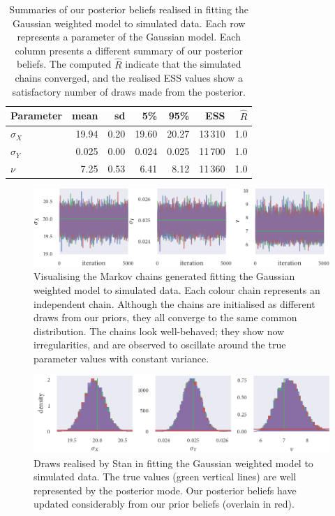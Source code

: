 \begin{table}[tbp]
  \begin{tabular}{@{}lrrrrrr@{}}
    \toprule
    Parameter    & mean  & sd   & 5\%   & 95\%  & ESS     & $\widehat{R}$ \\
    \midrule
    $\sigma_{X}$ & 19.94 & 0.20 & 19.60 & 20.27 & 13\,310 & 1.0           \\
    $\sigma_{Y}$ & 0.025 & 0.00 & 0.024 & 0.025 & 11\,700 & 1.0           \\
    $\nu$        & 7.25  & 0.53 & 6.41  & 8.12  & 11\,360 & 1.0           \\
    \bottomrule
  \end{tabular}
  \caption{Summaries of our posterior beliefs realised in fitting the Gaussian
    weighted model to simulated data. Each row represents a parameter of the
    Gaussian model. Each column presents a different summary of our posterior
    beliefs. The computed $\widehat{R}$ indicate that the simulated chains
    converged, and the realised ESS values show a satisfactory number of draws
    made from the posterior.}
  \label{tab:gauss_summary}
\end{table}%
\begin{figure}[tbp]
  \includegraphics{gauss_trace.pdf}
  \caption{Visualising the Markov chains generated fitting the Gaussian
    weighted model to simulated data. Each colour chain represents an independent
    chain. Although the chains are initialised as different draws from our
    priors, they all converge to the same common distribution. The chains look
    well-behaved; they show now irregularities, and are observed to oscillate
    around the true parameter values with constant variance.}
  \label{fig:gauss_trace}
\end{figure}%
\begin{figure}[tbp]
  \includegraphics{gauss_hist.pdf}
  \caption{Draws realised by Stan in fitting the Gaussian weighted model to
    simulated data. The true values (green vertical lines) are well
    represented by the posterior mode. Our posterior beliefs have updated
    considerably from our prior beliefs (overlain in red).}
  \label{fig:gauss_hist}
\end{figure}

